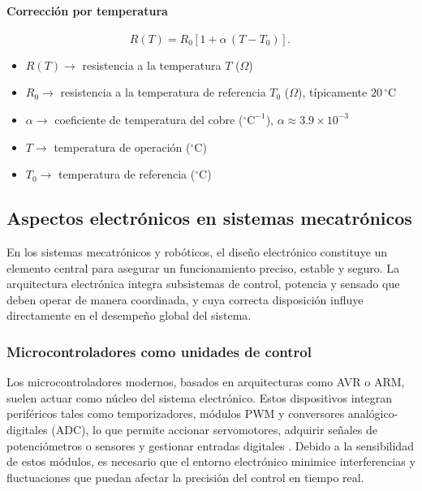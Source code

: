 \cite{libretexts_resistivity_2025}

\paragraph{Corrección por temperatura}
\begin{equation}
  R(T) = R_{0}\,\bigl[\,1+\alpha\,(T-T_{0})\,\bigr] \,.\,
\end{equation}

\begin{itemize}
  \item $R(T) \rightarrow$ resistencia a la temperatura $T$ ($\Omega$)
  \item $R_{0} \rightarrow$ resistencia a la temperatura de referencia $T_{0}$ ($\Omega$), típicamente $20\,^{\circ}\mathrm{C}$
  \item $\alpha \rightarrow$ coeficiente de temperatura del cobre ($^{\circ}\mathrm{C}^{-1}$), $\alpha \approx 3.9\times 10^{-3}$
  \item $T \rightarrow$ temperatura de operación ($^{\circ}\mathrm{C}$)
  \item $T_{0} \rightarrow$ temperatura de referencia ($^{\circ}\mathrm{C}$)
\end{itemize}

\cite{hyperphysics_tcr_cu}







\subsection{Aspectos electrónicos en sistemas mecatrónicos}

En los sistemas mecatrónicos y robóticos, el diseño electrónico constituye un elemento central para asegurar un funcionamiento preciso, estable y seguro. La arquitectura electrónica integra subsistemas de control, potencia y sensado que deben operar de manera coordinada, y cuya correcta disposición influye directamente en el desempeño global del sistema.

\subsubsection{Microcontroladores como unidades de control}

Los microcontroladores modernos, basados en arquitecturas como AVR o ARM, suelen actuar como núcleo del sistema electrónico. Estos dispositivos integran periféricos tales como temporizadores, módulos PWM y conversores analógico-digitales (ADC), lo que permite accionar servomotores, adquirir señales de potenciómetros o sensores y gestionar entradas digitales \cite{arduino_uno_rev3_docs, espressif_esp32_series_ds}. Debido a la sensibilidad de estos módulos, es necesario que el entorno electrónico minimice interferencias y fluctuaciones que puedan afectar la precisión del control en tiempo real.

